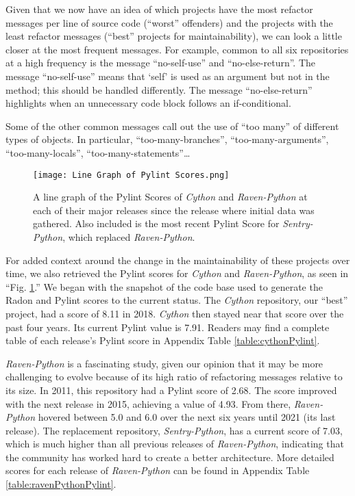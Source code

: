 Given that we now have an idea of which projects have the most refactor messages per line of source code (``worst'' offenders) and the projects with the least refactor messages (``best'' projects for maintainability), we can look a little closer at the most frequent messages. For example, common to all six repositories at a high frequency is the message ``no-self-use'' and ``no-else-return''. The message ``no-self-use'' means that `self' is used as an argument but not in the method; this should be handled differently. The message ``no-else-return'' highlights when an unnecessary code block follows an if-conditional.

Some of the other common messages call out the use of ``too many'' of different types of objects. In particular, ``too-many-branches'', ``too-many-arguments'', ``too-many-locals'', ``too-many-statements''\dots

\begin{figure}[ht]
  \centerline{
    \texttt{[image: Line Graph of Pylint Scores.png]}
  }
  \caption{A line graph of the Pylint Scores of \emph{Cython} and \emph{Raven-Python} at each of their major releases since the release where initial data was gathered. Also included is the most recent Pylint Score for \emph{Sentry-Python}, which replaced \emph{Raven-Python}.}
  \label{figPylintScores}
\end{figure}

For added context around the change in the maintainability of these projects over time, we also retrieved the Pylint scores for \emph{Cython} and \emph{Raven-Python}, as seen in ``Fig. \ref{figPylintScores}.'' We began with the snapshot of the code base used to generate the Radon and Pylint scores to the current status. The \emph{Cython} repository, our ``best'' project, had a score of 8.11 in 2018. \emph{Cython} then stayed near that score over the past four years. Its current Pylint value is 7.91. Readers may find a complete table of each release's Pylint score in Appendix Table \ref{table:cythonPylint}.

\emph{Raven-Python} is a fascinating study, given our opinion that it may be more challenging to evolve because of its high ratio of refactoring messages relative to its size. In 2011, this repository had a Pylint score of 2.68. The score improved with the next release in 2015, achieving a value of 4.93. From there, \emph{Raven-Python} hovered between 5.0 and 6.0 over the next six years until 2021 (its last release). The replacement repository, \emph{Sentry-Python}, has a current score of 7.03, which is much higher than all previous releases of \emph{Raven-Python}, indicating that the community has worked hard to create a better architecture. More detailed scores for each release of \emph{Raven-Python} can be found in Appendix Table \ref{table:ravenPythonPylint}.

